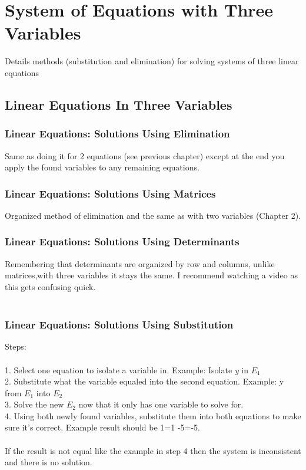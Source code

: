 \chapter{System of Equations with Three Variables}
Details methods (substitution and elimination) for solving systems of three linear equations
\section{Linear Equations In Three Variables}

\subsection{Linear Equations: Solutions Using Elimination}
Same as doing it for 2 equations (see previous chapter) except at the end you apply the found variables to any remaining equations.

\subsection{Linear Equations: Solutions Using Matrices}
Organized method of elimination and the same as with two variables (Chapter 2).

\subsection{Linear Equations: Solutions Using Determinants}
Remembering that determinants are organized by row and columns, unlike matrices,with three variables it stays the same. I recommend watching a video as this gets confusing quick.\\
\\
\newpage
\subsection{Linear Equations: Solutions Using Substitution}
Steps: \\ \\
1. Select one equation to isolate a variable in. Example: Isolate \textit{y} in $E_1$\\
2. Substitute what the variable equaled into the second equation. Example: y from $E_1$ into $E_2$\\
3. Solve the new $E_2$ now that it only has one variable to solve for.\\
4. Using both newly found variables, substitute them into both equations to make sure it's correct. Example result should be 1=1 -5=-5.\\
\\
If the result is not equal like the example in step 4 then the system is inconsistent and there is no solution.


